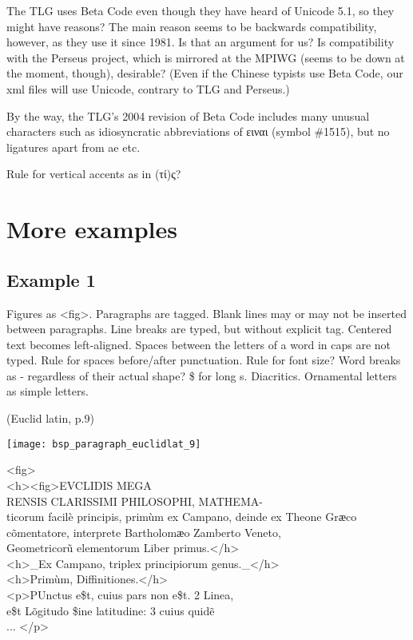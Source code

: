 The TLG uses Beta Code even though they have heard of Unicode 5.1, so they might have reasons? The main reason seems to be backwards compatibility, however, as they use it since 1981. Is that an argument for us? Is compatibility with the Perseus project, which is mirrored at the MPIWG (seems to be down at the moment, though), desirable? (Even if the Chinese typists use Beta Code, our xml files will use Unicode, contrary to TLG and Perseus.)

By the way, the TLG's 2004 revision of Beta Code includes many unusual characters such as idiosyncratic abbreviations of ειναι (symbol \#1515), but no ligatures apart from ae etc. 


Rule for vertical accents as in (τί)ς? 

\section{More examples}

\subsection{Example 1}
\label{Structural markup general example}

Figures as <fig>. Paragraphs are tagged. Blank lines may or may not be inserted between paragraphs. Line breaks are typed, but without explicit tag. Centered text becomes left-aligned. Spaces between the letters of a word in caps are not typed. Rule for spaces before/after punctuation. Rule for font size? Word breaks as - regardless of their actual shape? \$ for long s. Diacritics. Ornamental letters as simple letters. 

\begin{example} (Euclid latin, p.9)

\texttt{[image: bsp\_paragraph\_euclidlat\_9]} 

\begin{typeLatin}
<fig> \\
<h><fig>EVCLIDIS MEGA \\
RENSIS CLARISSIMI PHILOSOPHI, MATHEMA- \\
ticorum facilè principis, primùm ex Campano, deinde ex Theone Grӕco \\
cõmentatore, interprete Bartholomӕo Zamberto Veneto, \\
Geometricorũ elementorum Liber primus.</h> \\
<h>_Ex Campano, triplex principiorum genus._</h> \\
<h>Primùm, Diffinitiones.</h> \\
<p>PUnctus e\$t, cuius pars non e\$t. 2 Linea, \\
e\$t Lõgitudo \$ine latitudine: 3 cuius quidẽ \\
... </p> 
\end{typeLatin}

\end{example}

